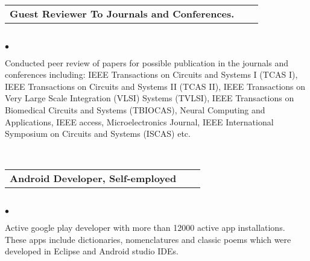 \begin{tabular}{L{12cm}p{3cm}r}\bf \bf  { Guest Reviewer To  Journals and Conferences.} &&\mdseries {} \end{tabular}\normalsize \mdseries\\
 \phantom \quad $\bullet$     \begin{minipage}[t]{0.965\textwidth}
  Conducted peer review of papers for possible publication in the  journals and conferences including: IEEE Transactions on Circuits and Systems  I (TCAS I), IEEE Transactions on Circuits and Systems  II (TCAS II), IEEE Transactions on Very Large Scale Integration (VLSI) Systems (TVLSI), IEEE Transactions on Biomedical Circuits and Systems (TBIOCAS),  Neural Computing and Applications, IEEE access, Microelectronics Journal, IEEE International Symposium on Circuits and Systems (ISCAS) etc.\end{minipage} \phantom  \mdseries \\ 
\begin{tabular}{L{12cm}p{3cm}r}\bf  { Android Developer, Self-employed }&&\mdseries {}\mdseries \normalsize \end{tabular}\\
\phantom \quad $\bullet$  \begin{minipage}[t]{0.965\textwidth} Active google play developer with more than 12000 active app installations.
 These apps include dictionaries, nomenclatures and classic poems which were developed in Eclipse and Android studio IDEs. 
\end{minipage}\\  \\ \\
